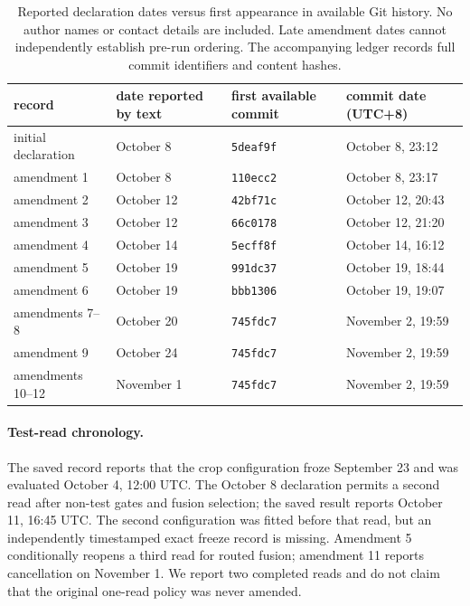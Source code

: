 \documentclass[letterpaper]{article}
\begin{document}
\begin{table}[t]
\centering\small
\begin{tabular}{llll}
\toprule
record & date reported by text & first available commit & commit date (UTC+8) \\
\midrule
initial declaration & October 8 & \texttt{5deaf9f} & October 8, 23:12 \\
amendment 1 & October 8 & \texttt{110ecc2} & October 8, 23:17 \\
amendment 2 & October 12 & \texttt{42bf71c} & October 12, 20:43 \\
amendment 3 & October 12 & \texttt{66c0178} & October 12, 21:20 \\
amendment 4 & October 14 & \texttt{5ecff8f} & October 14, 16:12 \\
amendment 5 & October 19 & \texttt{991dc37} & October 19, 18:44 \\
amendment 6 & October 19 & \texttt{bbb1306} & October 19, 19:07 \\
amendments 7--8 & October 20 & \texttt{745fdc7} & November 2, 19:59 \\
amendment 9 & October 24 & \texttt{745fdc7} & November 2, 19:59 \\
amendments 10--12 & November 1 & \texttt{745fdc7} & November 2, 19:59 \\
\bottomrule
\end{tabular}
\caption{Reported declaration dates versus first appearance in available Git history. No author names or contact details are included. Late amendment dates cannot independently establish pre-run ordering. The accompanying ledger records full commit identifiers and content hashes.}
\end{table}

\paragraph{Test-read chronology.} The saved record reports that the crop configuration froze September 23 and was evaluated October 4, 12:00 UTC. The October 8 declaration permits a second read after non-test gates and fusion selection; the saved result reports October 11, 16:45 UTC. The second configuration was fitted before that read, but an independently timestamped exact freeze record is missing. Amendment 5 conditionally reopens a third read for routed fusion; amendment 11 reports cancellation on November 1. We report two completed reads and do not claim that the original one-read policy was never amended.
\end{document}
